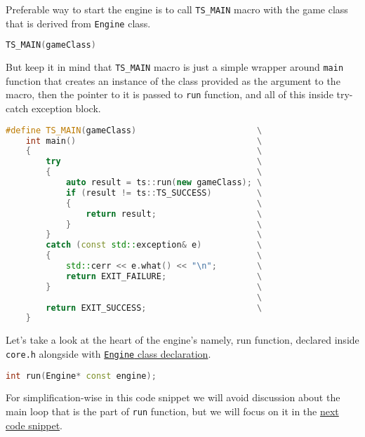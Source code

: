 Preferable way to start the engine is to call \texttt{TS\_MAIN} macro with the game class that is derived from \texttt{Engine} class. 
\begin{lstlisting}[language=c++, caption=Start of the example game (./game/game.cpp)]
TS_MAIN(gameClass)
\end{lstlisting}
But keep it in mind that \texttt{TS\_MAIN} macro is just a simple wrapper around \texttt{main} function that creates an instance of the class provided as the argument to the macro, then the pointer to it is passed to \texttt{run} function, and all of this inside try-catch exception block.
\begin{lstlisting}[language=c++, caption=\texttt{TS\_MAIN} definition (./engine/include/tsengine/core.h)]
#define TS_MAIN(gameClass)                        \
    int main()                                    \
    {                                             \
        try                                       \
        {                                         \
            auto result = ts::run(new gameClass); \
            if (result != ts::TS_SUCCESS)         \
            {                                     \
                return result;                    \
            }                                     \
        }                                         \
        catch (const std::exception& e)           \
        {                                         \
            std::cerr << e.what() << "\n";        \
            return EXIT_FAILURE;                  \
        }                                         \
                                                  \
        return EXIT_SUCCESS;                      \
    }
\end{lstlisting}

\label{sec:run_fun}
Let's take a look at the heart of the engine's namely, run function, declared inside \texttt{core.h} alongside with \hyperref[sec:engine_class]{\texttt{Engine} class declaration}.
\begin{lstlisting}[language=c++, caption=Run function (./engine/include/tsengine/core.h)]
int run(Engine* const engine);
\end{lstlisting}
For simplification-wise in this code snippet we will avoid discussion about the main loop that is the part of \texttt{run} function, but we will focus on it in the \hyperref[main_loop]{next code snippet}.

